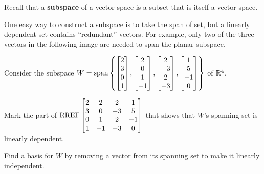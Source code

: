 \begin{observation}
Recall that a \textbf{subspace} of a vector space is a subset that is itself a vector space.

\vspace{1em}

One easy way to construct a subspace is to take the span of set,
but a linearly dependent set contains ``redundant'' vectors. For example,
only two of the three vectors in the following image are needed to span
the planar subspace.

\begin{center}
\end{center}
\end{observation}

\begin{activity}{10}
  Consider the subspace \(W=\operatorname{span}\left\{
  \begin{bmatrix}2\\3\\0\\1\end{bmatrix},
  \begin{bmatrix}2\\0\\1\\-1\end{bmatrix},
  \begin{bmatrix}2\\-3\\2\\-3\end{bmatrix},
  \begin{bmatrix}1\\5\\-1\\0\end{bmatrix}
  \right\}
  \) of \(\mathbb{R}^4\).

  \begin{subactivity}
    Mark the part of \(\operatorname{RREF}\begin{bmatrix}
    2&2&2&1\\
    3&0&-3&5\\
    0&1&2&-1\\
    1&-1&-3&0
    \end{bmatrix}\) that shows that \(W\)'s spanning set
    is linearly dependent.
  \end{subactivity}

  \begin{subactivity}
    Find a basis for \(W\) by removing a vector from its spanning set
    to make it linearly independent.
  \end{subactivity}
\end{activity}

